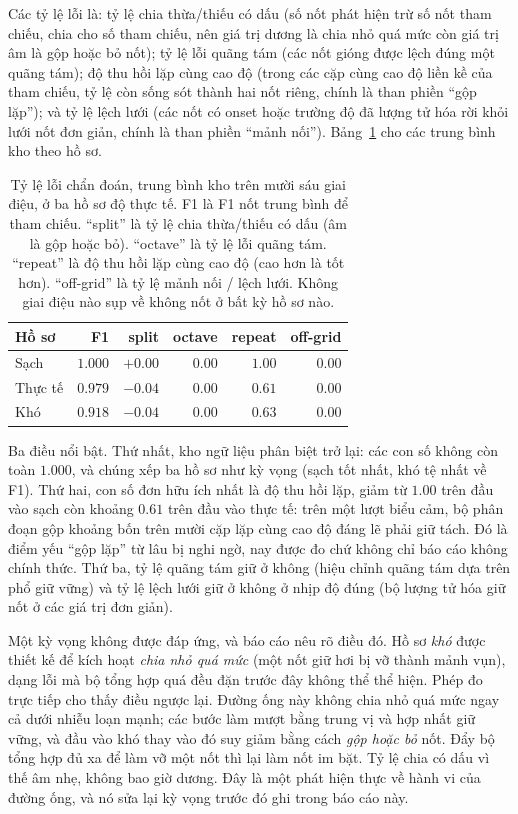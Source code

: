 \documentclass[12pt,a4paper]{article}
\begin{document}
Các tỷ lệ lỗi là: tỷ lệ chia thừa/thiếu có dấu (số nốt phát hiện trừ số nốt tham
chiếu, chia cho số tham chiếu, nên giá trị dương là chia nhỏ quá mức còn giá trị âm
là gộp hoặc bỏ nốt); tỷ lệ lỗi quãng tám (các nốt gióng được lệch đúng một quãng
tám); độ thu hồi lặp cùng cao độ (trong các cặp cùng cao độ liền kề của tham chiếu,
tỷ lệ còn sống sót thành hai nốt riêng, chính là than phiền ``gộp lặp''); và tỷ lệ
lệch lưới (các nốt có onset hoặc trường độ đã lượng tử hóa rời khỏi lưới nốt đơn
giản, chính là than phiền ``mảnh nối''). Bảng~\ref{tab:diag} cho các trung bình kho
theo hồ sơ.

\begin{table}[H]
\centering
\caption{Tỷ lệ lỗi chẩn đoán, trung bình kho trên mười sáu giai điệu, ở ba hồ sơ độ
thực tế. F1 là F1 nốt trung bình để tham chiếu. ``split'' là tỷ lệ chia thừa/thiếu
có dấu (âm là gộp hoặc bỏ). ``octave'' là tỷ lệ lỗi quãng tám. ``repeat'' là độ thu
hồi lặp cùng cao độ (cao hơn là tốt hơn). ``off-grid'' là tỷ lệ mảnh nối / lệch
lưới. Không giai điệu nào sụp về không nốt ở bất kỳ hồ sơ nào.}
\label{tab:diag}
\begin{tabular}{l r r r r r}
\toprule
\textbf{Hồ sơ} & \textbf{F1} & \textbf{split} & \textbf{octave} &
\textbf{repeat} & \textbf{off-grid} \\
\midrule
Sạch       & $1.000$ & $+0.00$ & $0.00$ & $1.00$ & $0.00$ \\
Thực tế    & $0.979$ & $-0.04$ & $0.00$ & $0.61$ & $0.00$ \\
Khó        & $0.918$ & $-0.04$ & $0.00$ & $0.63$ & $0.00$ \\
\bottomrule
\end{tabular}
\end{table}

Ba điều nổi bật. Thứ nhất, kho ngữ liệu phân biệt trở lại: các con số không còn toàn
$1.000$, và chúng xếp ba hồ sơ như kỳ vọng (sạch tốt nhất, khó tệ nhất về F1). Thứ
hai, con số đơn hữu ích nhất là độ thu hồi lặp, giảm từ $1.00$ trên đầu vào sạch còn
khoảng $0.61$ trên đầu vào thực tế: trên một lượt biểu cảm, bộ phân đoạn gộp khoảng
bốn trên mười cặp lặp cùng cao độ đáng lẽ phải giữ tách. Đó là điểm yếu ``gộp lặp''
từ lâu bị nghi ngờ, nay được đo chứ không chỉ báo cáo không chính thức. Thứ ba, tỷ
lệ quãng tám giữ ở không (hiệu chỉnh quãng tám dựa trên phổ giữ vững) và tỷ lệ lệch
lưới giữ ở không ở nhịp độ đúng (bộ lượng tử hóa giữ nốt ở các giá trị đơn giản).

Một kỳ vọng không được đáp ứng, và báo cáo nêu rõ điều đó. Hồ sơ \emph{khó} được
thiết kế để kích hoạt \emph{chia nhỏ quá mức} (một nốt giữ hơi bị vỡ thành mảnh
vụn), dạng lỗi mà bộ tổng hợp quá đều đặn trước đây không thể thể hiện. Phép đo trực
tiếp cho thấy điều ngược lại. Đường ống này không chia nhỏ quá mức ngay cả dưới nhiễu
loạn mạnh; các bước làm mượt bằng trung vị và hợp nhất giữ vững, và đầu vào khó thay
vào đó suy giảm bằng cách \emph{gộp hoặc bỏ} nốt. Đẩy bộ tổng hợp đủ xa để làm vỡ
một nốt thì lại làm nốt im bặt. Tỷ lệ chia có dấu vì thế âm nhẹ, không bao giờ dương.
Đây là một phát hiện thực về hành vi của đường ống, và nó sửa lại kỳ vọng trước đó
ghi trong báo cáo này.
\end{document}
